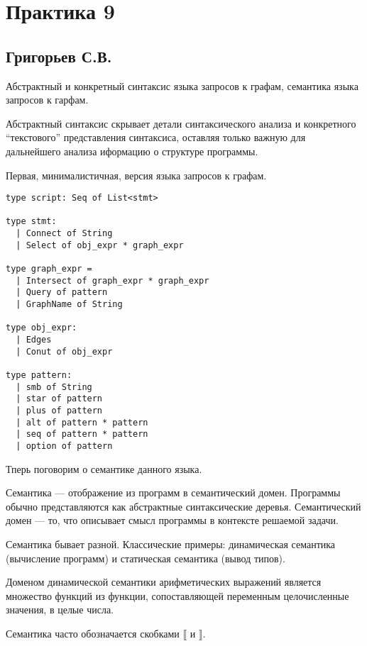 \section{Практика 9}

\subsection{Григорьев С.В.}

Абстрактный и конкретный синтаксис языка запросов к графам, семантика языка запросов к гарфам.

Абстрактный синтаксис скрывает детали синтаксического анализа и конкретного ``текстового'' представления синтаксиса, оставляя только важную для дальнейшего анализа иформацию о структуре программы. 

Первая, минималистичная, версия языка запросов к графам.

\begin{verbatim}
type script: Seq of List<stmt>

type stmt:
  | Connect of String
  | Select of obj_expr * graph_expr

type graph_expr =
  | Intersect of graph_expr * graph_expr 
  | Query of pattern
  | GraphName of String

type obj_expr:
  | Edges   
  | Conut of obj_expr
  
type pattern: 
  | smb of String
  | star of pattern
  | plus of pattern
  | alt of pattern * pattern
  | seq of pattern * pattern
  | option of pattern

\end{verbatim}

\newcommand{\sem}[1]{\llbracket #1 \rrbracket}

Тперь поговорим о семантике данного языка. 

Семантика --- отображение из программ в семантический домен.
Программы обычно представляются как абстрактные синтаксические деревья.
Семантический домен --- то, что описывает смысл программы в контексте решаемой задачи.

Семантика бывает разной.
Классические примеры: динамическая семантика (вычисление программ) и статическая семантика (вывод типов).

Доменом динамической семантики арифметических выражений является множество функций из функции, сопоставляющей переменным целочисленные значения, в целые числа.

Семантика часто обозначается скобками $\llbracket$ и $\rrbracket$.

